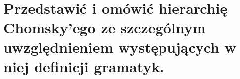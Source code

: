 \section{Przedstawić i omówić hierarchię Chomsky’ego ze szczególnym uwzględnieniem występujących w niej definicji gramatyk.}
